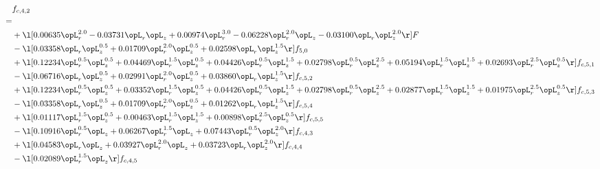 \begin{alignat}{2} 
\label{eq:f_42_2} 
& f_{c,4,2} \nonumber \\ 
 = \\ 
& + \l[  0.00635 \opL_r^{2.0}   -0.03731 \opL_r \opL_z +  0.00974 \opL_r^{3.0}   -0.06228 \opL_r^{2.0} \opL_z   -0.03100 \opL_r \opL_z^{2.0}  \r] F \nonumber \\ 
& - \l[  0.03358 \opL_r \opL_z^{0.5} +  0.01709 \opL_r^{2.0} \opL_z^{0.5} +  0.02598 \opL_r \opL_z^{1.5}  \r] f_{5,0} \nonumber \\ 
& + \l[  0.12234 \opL_r^{0.5} \opL_z^{0.5} +  0.04469 \opL_r^{1.5} \opL_z^{0.5} +  0.04426 \opL_r^{0.5} \opL_z^{1.5} +  0.02798 \opL_r^{0.5} \opL_z^{2.5} +  0.05194 \opL_r^{1.5} \opL_z^{1.5} +  0.02693 \opL_r^{2.5} \opL_z^{0.5}  \r] f_{c,5,1} \nonumber \\ 
& - \l[  0.06716 \opL_r \opL_z^{0.5} +  0.02991 \opL_r^{2.0} \opL_z^{0.5} +  0.03860 \opL_r \opL_z^{1.5}  \r] f_{c,5,2} \nonumber \\ 
& + \l[  0.12234 \opL_r^{0.5} \opL_z^{0.5} +  0.03352 \opL_r^{1.5} \opL_z^{0.5} +  0.04426 \opL_r^{0.5} \opL_z^{1.5} +  0.02798 \opL_r^{0.5} \opL_z^{2.5} +  0.02877 \opL_r^{1.5} \opL_z^{1.5} +  0.01975 \opL_r^{2.5} \opL_z^{0.5}  \r] f_{c,5,3} \nonumber \\ 
& - \l[  0.03358 \opL_r \opL_z^{0.5} +  0.01709 \opL_r^{2.0} \opL_z^{0.5} +  0.01262 \opL_r \opL_z^{1.5}  \r] f_{c,5,4} \nonumber \\ 
& + \l[  0.01117 \opL_r^{1.5} \opL_z^{0.5} +  0.00463 \opL_r^{1.5} \opL_z^{1.5} +  0.00898 \opL_r^{2.5} \opL_z^{0.5}  \r] f_{c,5,5} \nonumber \\ 
& - \l[  0.10916 \opL_r^{0.5} \opL_z +  0.06267 \opL_r^{1.5} \opL_z +  0.07443 \opL_r^{0.5} \opL_z^{2.0}  \r] f_{c,4,3} \nonumber \\ 
& + \l[  0.04583 \opL_r \opL_z +  0.03927 \opL_r^{2.0} \opL_z +  0.03723 \opL_r \opL_z^{2.0}  \r] f_{c,4,4} \nonumber \\ 
& - \l[  0.02089 \opL_r^{1.5} \opL_z  \r] f_{c,4,5} \nonumber \\ 
\end{alignat} 


